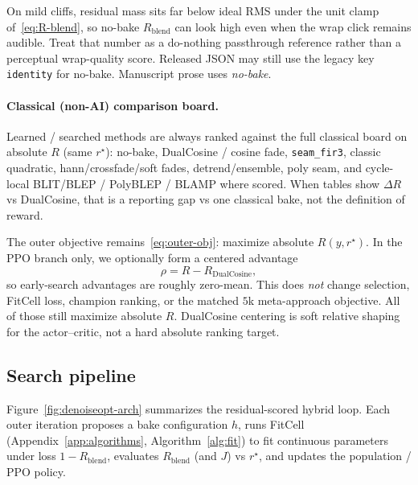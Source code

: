 On mild cliffs, residual mass sits far below ideal RMS under the unit clamp of~\eqref{eq:R-blend}, so no-bake $R_{\mathrm{blend}}$ can look high even when the wrap click remains audible.
Treat that number as a do-nothing passthrough reference rather than a perceptual wrap-quality score.
Released JSON may still use the legacy key \texttt{identity} for no-bake.
Manuscript prose uses \emph{no-bake}.

\paragraph{Classical (non-AI) comparison board.}
\label{sec:classical-board}
Learned / searched methods are always ranked against the full classical board on absolute $R$ (same $r^{\star}$):
no-bake, DualCosine / cosine fade, \texttt{seam\_fir3}, classic quadratic, hann/crossfade/soft fades, detrend/ensemble, poly seam, and cycle-local BLIT/BLEP / PolyBLEP / BLAMP where scored.
When tables show $\Delta R$ vs DualCosine, that is a reporting gap vs one classical bake, not the definition of reward.

\begin{remark}
\label{rem:dualcosine-centering}
The outer objective remains~\eqref{eq:outer-obj}: maximize absolute $R(y,r^{\star})$.
In the PPO branch only, we optionally form a centered advantage
\begin{equation}
\label{eq:dualcosine-centering}
\rho = R - R_{\mathrm{DualCosine}},
\end{equation}
so early-search advantages are roughly zero-mean.
This does \emph{not} change selection, FitCell loss, champion ranking, or the matched $5$k meta-approach objective.
All of those still maximize absolute $R$.
DualCosine centering is soft relative shaping for the actor--critic, not a hard absolute ranking target.
\end{remark}

\subsection{Search pipeline}
\label{sec:pipeline-overview}

Figure~\ref{fig:denoiseopt-arch} summarizes the residual-scored hybrid loop.
Each outer iteration proposes a bake configuration $h$, runs FitCell (Appendix~\ref{app:algorithms}, Algorithm~\ref{alg:fit}) to fit continuous parameters under loss $1-R_{\mathrm{blend}}$, evaluates $R_{\mathrm{blend}}$ (and $J$) vs $r^{\star}$, and updates the population / PPO policy.

